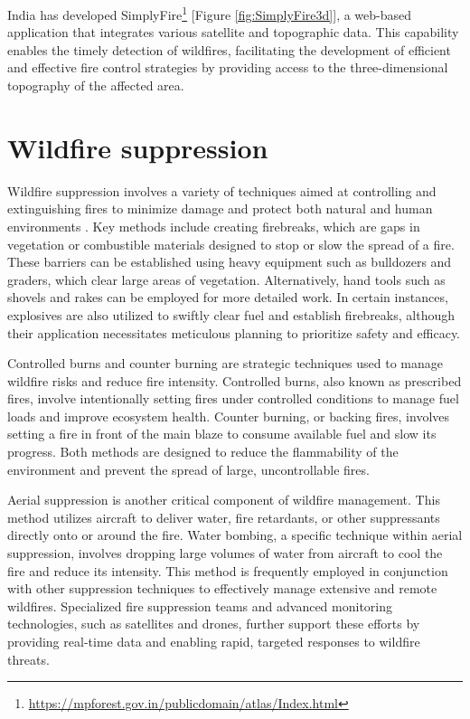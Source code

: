 \documentclass[
  12 pt,
]{Nemilov}
\begin{document}
India has developed SimplyFire\footnote{\url{https://mpforest.gov.in/publicdomain/atlas/Index.html}} {[}Figure \ref{fig:SimplyFire3d}{]}, a web-based application that integrates various satellite and topographic data. This capability enables the timely detection of wildfires, facilitating the development of efficient and effective fire control strategies by providing access to the three-dimensional topography of the affected area.

\chapter{Wildfire suppression}\label{wildfire-suppression}

Wildfire suppression involves a variety of techniques aimed at controlling and extinguishing fires to minimize damage and protect both natural and human environments \citep{plucinski2019contain}. Key methods include creating firebreaks, which are gaps in vegetation or combustible materials designed to stop or slow the spread of a fire. These barriers can be established using heavy equipment such as bulldozers and graders, which clear large areas of vegetation. Alternatively, hand tools such as shovels and rakes can be employed for more detailed work. In certain instances, explosives are also utilized to swiftly clear fuel and establish firebreaks, although their application necessitates meticulous planning to prioritize safety and efficacy.

Controlled burns and counter burning are strategic techniques used to manage wildfire risks and reduce fire intensity. Controlled burns, also known as prescribed fires, involve intentionally setting fires under controlled conditions to manage fuel loads and improve ecosystem health. Counter burning, or backing fires, involves setting a fire in front of the main blaze to consume available fuel and slow its progress. Both methods are designed to reduce the flammability of the environment and prevent the spread of large, uncontrollable fires.

Aerial suppression is another critical component of wildfire management. This method utilizes aircraft to deliver water, fire retardants, or other suppressants directly onto or around the fire. Water bombing, a specific technique within aerial suppression, involves dropping large volumes of water from aircraft to cool the fire and reduce its intensity. This method is frequently employed in conjunction with other suppression techniques to effectively manage extensive and remote wildfires. Specialized fire suppression teams and advanced monitoring technologies, such as satellites and drones, further support these efforts by providing real-time data and enabling rapid, targeted responses to wildfire threats.
\end{document}
